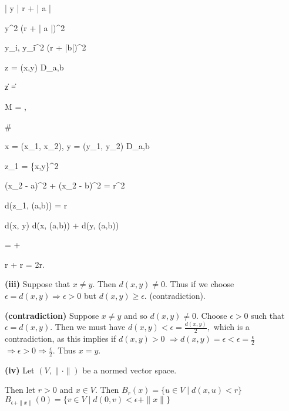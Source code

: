 \documentclass{article}
\theoremstyle{definition}
\numberwithin{equation}{section}
\begin{document}
\begin{center}
\end{center}

\Rightarrow \left| y \right | \leq r + \left| a \right|

\Rightarrow y^2 \leq (r + \left| a \right|)^2

 y_i, \quad y_i^2 \leq (r + \left|b\right|)^2

\forall z = (x,y) \in D_{a,b}

\left\| z \right\| = 

\leq {}

 M = , 

\# 

 x = (x_1, x_2), y = (y_1, y_2) \in D_{a,b}

z_1 = \{x,y\}^2

(x_2 - a)^2 + (x_2 - b)^2 = r^2

\Rightarrow d(z_1, (a,b)) =  \leq r

\Rightarrow d(x, y) \leq d(x, (a,b)) + d(y, (a,b))

=  + 

\leq r + r = 2r.

\textbf{(iii)} Suppose that $x \neq y$. Then $d(x, y) \neq 0$. Thus if we choose $\epsilon = d(x, y) \Rightarrow \epsilon > 0$ but $d(x, y) \geq \epsilon$. (contradiction).

\textbf{(contradiction)} Suppose $x \neq y$ and so $d(x, y) \neq 0$. 
Choose $\epsilon > 0$ such that $\epsilon = d(x, y)$. Then we must have
$ d(x, y) < \epsilon = \frac{d(x, y)}{2},$
which is a contradiction, as this implies 
if $d(x, y) > 0$ 
$\Rightarrow d(x, y) = \epsilon < \epsilon = \frac{\epsilon}{2} $
$\Rightarrow \epsilon > 0 \Rightarrow \frac{\epsilon}{2}.$
Thus $x = y$. 

\textbf{(iv)} Let $(V, \|\cdot\|)$ be a normed vector space. 

Then let $r > 0$ and $x \in V$. Then
$ B_r(x) = \{u \in V \mid d(x, u) < r\}$
$ B_{\epsilon + \| x \|}(0) = \{ v \in V \mid d(0, v) < \epsilon + \|x\| \}$
\end{document}
